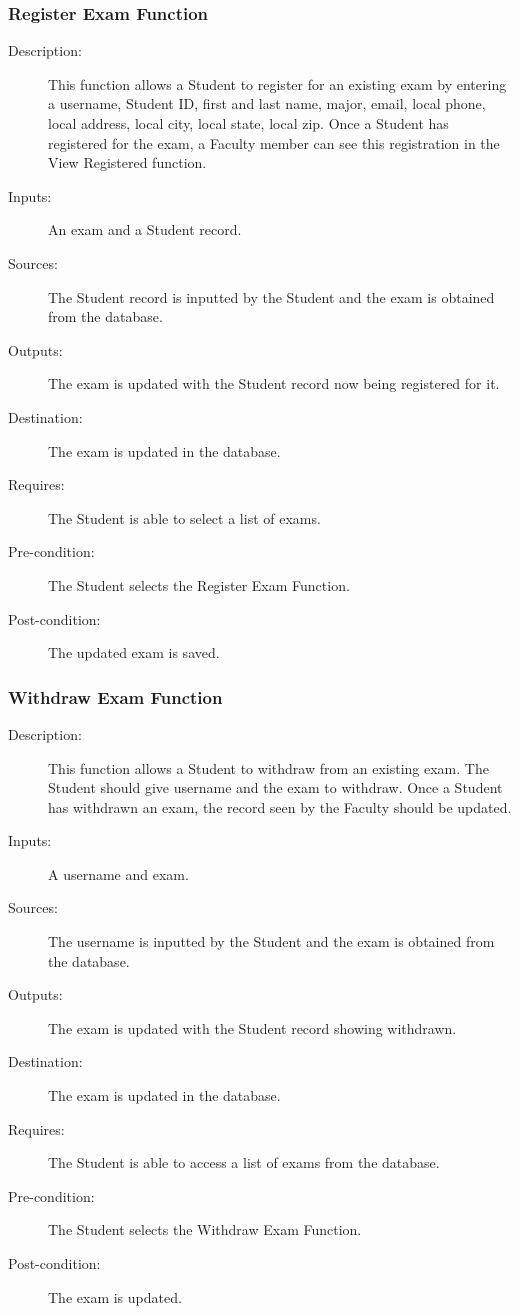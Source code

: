 \subsubsection{\large Register Exam Function} 
\begin{boxed} %
\begin{description}
\item[Description:]
   This function allows a Student to register for an existing exam by entering a
   username, Student ID, first and last name, major, email, local phone, local
   address, local city, local state, local zip.  Once a Student has registered
   for the exam, a Faculty member can see this registration in the View
   Registered function.
\item[Inputs:]
   An exam and a Student record.
\item[Sources:]
   The Student record is inputted by the Student and the exam is
   obtained from the database.
\item[Outputs:]
   The exam is updated with the Student record now being registered for
   it.
\item[Destination:]
   The exam is updated in the database.
\item[Requires:]
   The Student is able to select a list of exams.
\item[Pre-condition:]
   The Student selects the Register Exam Function.
\item[Post-condition:]
   The updated exam is saved.
\end{description}
\end{boxed} %

\subsubsection{\large Withdraw Exam Function} 
\begin{boxed} %
\begin{description}
\item[Description:]
   This function allows a Student to withdraw from an existing exam. The Student
   should give username and the exam to withdraw. Once a Student has withdrawn
   an exam, the record seen by the Faculty should be updated.
\item[Inputs:]
   A username and exam.
\item[Sources:]
   The username is inputted by the Student and the exam is obtained from
   the database.
\item[Outputs:]
   The exam is updated with the Student record showing withdrawn.
\item[Destination:]
   The exam is updated in the database.
\item[Requires:]
   The Student is able to access a list of exams from the database.
\item[Pre-condition:]
   The Student selects the Withdraw Exam Function.
\item[Post-condition:]
   The exam is updated.
\end{description}
\end{boxed} %

